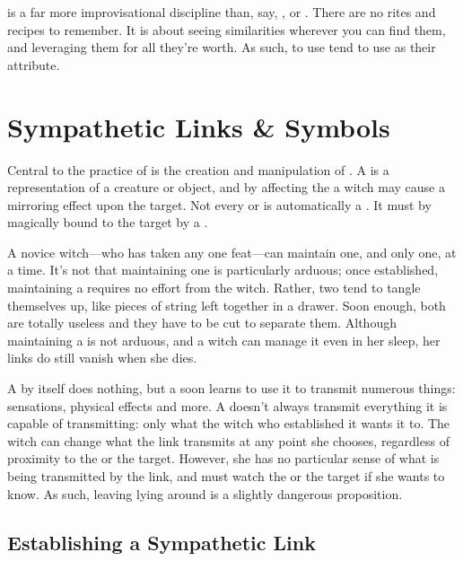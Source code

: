 
 is a far more improvisational discipline than, say, , or .
There are no rites and recipes to remember.
It is about seeing similarities wherever you can find them, and leveraging them for all they're worth.
As such, {\tests} to use  tend to use  as their attribute.

\section{Sympathetic Links \& Symbols}

Central to the practice of  is the creation and manipulation of {\symbols}.
A {\symbol} is a representation of a creature or object, and by affecting the {\symbol} a witch may cause a mirroring effect upon the target.
Not every  or  is automatically a {\symbol}.
It must by magically bound to the target by a {\symlink}.

A novice witch---who has taken any one  feat---can maintain one, and only one, {\symlink} at a time.
It's not that maintaining one is particularly arduous; once established, maintaining a {\symlink} requires no effort from the witch.
Rather, two {\symlinks} tend to tangle themselves up, like pieces of string left together in a drawer.
Soon enough, both are totally useless and they have to be cut to separate them.
Although maintaining a {\symlink} is not arduous, and a witch can manage it even in her sleep, her links do still vanish when she dies.

A {\symlink} by itself does nothing, but a  soon learns to use it to transmit numerous things: sensations, physical effects and more.
A {\symlink} doesn't always transmit everything it is capable of transmitting: only what the witch who established it wants it to.
The witch can change what the link transmits at any point she chooses, regardless of proximity to the {\symbol} or the target.
However, she has no particular sense of what is being transmitted by the link, and must watch the {\symbol} or the target if she wants to know.
As such, leaving {\symbols} lying around is a slightly dangerous proposition.

\subsection{Establishing a Sympathetic Link}

